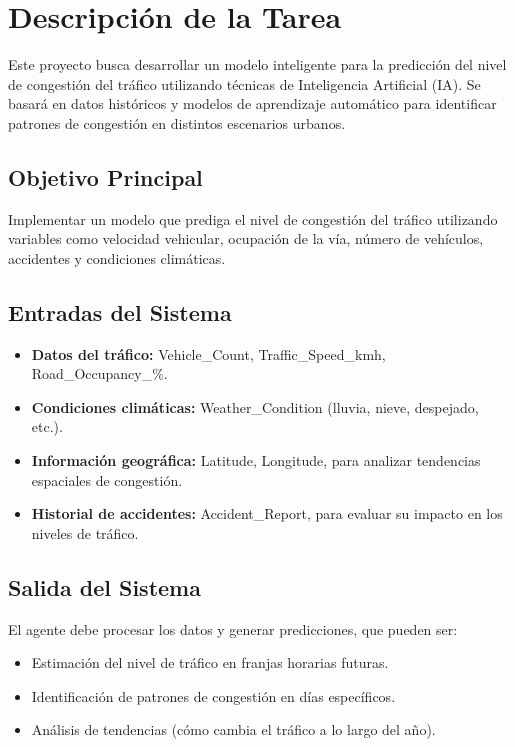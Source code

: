 \documentclass{svproc} %
\begin{document}
\section{Descripción de la Tarea}
Este proyecto busca desarrollar un modelo inteligente para la predicción del nivel de
congestión del tráfico utilizando técnicas de Inteligencia Artificial (IA). Se basará en
datos históricos y modelos de aprendizaje automático para identificar patrones de
congestión en distintos escenarios urbanos.

\subsection{Objetivo Principal}
Implementar un modelo que prediga el nivel de congestión del tráfico utilizando
variables como velocidad vehicular, ocupación de la vía, número de vehículos, accidentes
y condiciones climáticas.

\subsection{Entradas del Sistema}
\begin{itemize}
    \item \textbf{Datos del tráfico:} Vehicle\_Count, Traffic\_Speed\_kmh, Road\_Occupancy\_\%.
    \item \textbf{Condiciones climáticas:} Weather\_Condition (lluvia, nieve, despejado, etc.).
    \item \textbf{Información geográfica:} Latitude, Longitude, para analizar tendencias espaciales de congestión.
    \item \textbf{Historial de accidentes:} Accident\_Report, para evaluar su impacto en los niveles de tráfico.
\end{itemize}

\subsection{Salida del Sistema}
El agente debe procesar los datos y generar predicciones, que pueden ser:
\begin{itemize}
    \item Estimación del nivel de tráfico en franjas horarias futuras.
    \item Identificación de patrones de congestión en días específicos.
    \item Análisis de tendencias (cómo cambia el tráfico a lo largo del año).
\end{itemize}
\end{document}
